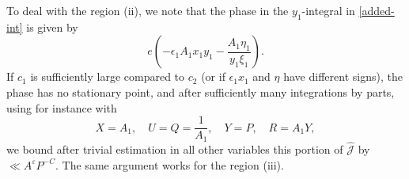 \documentclass[11pt]{amsart}
\theoremstyle{plain}
\numberwithin{equation}{section}
\theoremstyle{definition}
\renewcommand{\geq}{\geqslant}
\renewcommand{\leq}{\leqslant}
\begin{document}
To deal with the region (ii), we note that the phase in the $y_1$-integral in \eqref{added-int} is given by 
$$e\left( - \epsilon_1A_1x_1y_1 - \frac{A_1\eta_1}{y_1\xi_1}\right).$$
 If $c_1$ is sufficiently large compared to $c_2$ (or if $\epsilon_1 x_1$ and $\eta$ have different signs), the phase has no stationary point, and after sufficiently many integrations by parts,  using for instance \cite[Lemma 8.1]{BKY} with
$$X = A_1, \quad U = Q = \frac{1}{A_1}, \quad Y = P, \quad R = A_1Y,$$
we bound after trivial estimation in all other variables this portion of $\widehat{\mathcal{J}}$ by $ \ll A^{\varepsilon}P^{-C}.$ The same argument works for the region (iii).






\end{document}
